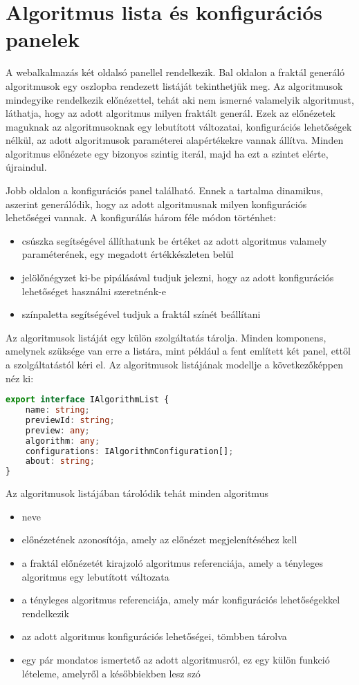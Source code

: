 \section{Algoritmus lista és konfigurációs panelek}
A webalkalmazás két oldalsó panellel rendelkezik. Bal oldalon a fraktál generáló algoritmusok egy oszlopba rendezett listáját tekinthetjük meg. Az algoritmusok mindegyike rendelkezik előnézettel, tehát aki nem ismerné valamelyik algoritmust, láthatja, hogy az adott algoritmus milyen fraktált generál. Ezek az előnézetek maguknak az algoritmusoknak egy lebutított változatai, konfigurációs lehetőségek nélkül, az adott algoritmusok paraméterei alapértékekre vannak állítva. Minden algoritmus előnézete egy bizonyos szintig iterál, majd ha ezt a szintet elérte, újraindul. 
\par Jobb oldalon a konfigurációs panel található. Ennek a tartalma dinamikus, aszerint generálódik, hogy az adott algoritmusnak milyen konfigurációs lehetőségei vannak. A konfigurálás három féle módon történhet:
\begin{itemize}
	\item  csúszka segítségével állíthatunk be értéket az adott algoritmus valamely paraméterének, egy megadott értékkészleten belül
	\item jelölőnégyzet ki-be pipálásával tudjuk jelezni, hogy az adott konfigurációs lehetőséget használni szeretnénk-e
	\item színpaletta segítségével tudjuk a fraktál színét beállítani
\end{itemize}
\par Az algoritmusok listáját egy külön szolgáltatás tárolja. Minden komponens, amelynek szüksége van erre a listára, mint például a fent említett két panel, ettől a szolgáltatástól kéri el. Az algoritmusok listájának modellje a következőképpen néz ki:
\begin{lstlisting}[language=typescript]
export interface IAlgorithmList {
	name: string;
	previewId: string;
	preview: any;
	algorithm: any;
	configurations: IAlgorithmConfiguration[];
	about: string;
}
\end{lstlisting}
Az algoritmusok listájában tárolódik tehát minden algoritmus
\begin{itemize}
	\item neve
	\item előnézetének azonosítója, amely az előnézet megjelenítéséhez kell
	\item a fraktál előnézetét kirajzoló algoritmus referenciája, amely a tényleges algoritmus egy lebutított változata
	\item a tényleges algoritmus referenciája, amely már konfigurációs lehetőségekkel rendelkezik
	\item az adott algoritmus konfigurációs lehetőségei, tömbben tárolva
	\item egy pár mondatos ismertető az adott algoritmusról, ez egy külön funkció lételeme, amelyről a későbbiekben lesz szó
\end{itemize}
